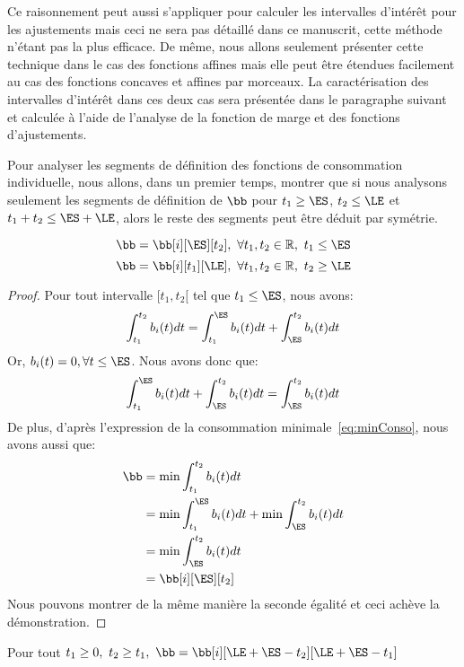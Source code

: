 Ce raisonnement peut aussi s'appliquer pour calculer les intervalles
d'intérêt pour les ajustements mais ceci ne sera pas détaillé dans ce
manuscrit, cette méthode n'étant pas la plus efficace. De même, nous
allons seulement présenter cette technique dans le cas des fonctions
affines mais elle peut être étendues facilement au cas des fonctions
concaves et affines par morceaux. La caractérisation des intervalles
d'intérêt dans ces deux cas sera présentée dans le paragraphe suivant
et calculée à l'aide de l'analyse de la fonction de marge et des
fonctions d'ajustements. 

Pour analyser les segments de définition des fonctions de consommation
individuelle, nous allons, dans un premier temps, montrer que si nous
analysons seulement les segments de définition de $\bb$ pour $t_1 \ge
\ES$, $t_2 \le \LE$ et $t_1+t_2 \le \ES + \LE$, alors le reste des
segments peut être déduit par symétrie.

\begin{lemma}
  \label{lem:sym1}
  \[\bb=\bb[i][\ES][t_2], \ \forall t_1,t_2 \in \mathbb{R},\ t_1 \le \ES\]
  \[\bb=\bb[i][t_1][\LE], \ \forall t_1,t_2 \in \mathbb{R},\ t_2 \ge
    \LE\]
\end{lemma}

\begin{proof}
  Pour tout intervalle $[t_1,t_2[$ tel que $t_1 \le \ES$, nous avons:
  \[ \int_{t_1}^{t_2} b_i(t)dt = \int_{t_1}^{\ES} b_i(t)dt+\int_{\ES}^{t_2} b_i(t)dt\]
  Or, $b_i(t)=0, \forall t \le \ES$. Nous avons donc que:
  \[\int_{t_1}^{\ES} b_i(t)dt+\int_{\ES}^{t_2} b_i(t)dt=
    \int_{\ES}^{t_2} b_i(t)dt\]
  De plus, d'après l'expression de la consommation
  minimale~\eqref{eq:minConso}, nous avons aussi que:
  \begin{align*}
    \bb &= \min \int_{t_1}^{t_2} b_i(t)dt \\
        &=\min \int_{t_1}^{\ES} b_i(t)dt+ \min \int_{\ES}^{t_2} b_i(t)dt\\
        &= \min \int_{\ES}^{t_2} b_i(t)dt\\
        & = \bb[i][\ES][t_2]
  \end{align*}
  Nous pouvons montrer de la même manière la seconde égalité et ceci
  achève la démonstration.
\end{proof}


\begin{lemma}
  \label{lem:sym2}
  Pour tout $t_1 \ge 0,\ t_2 \ge t_1,\ \bb= \bb[i][\LE+\ES-t_2][\LE +
  \ES -t_1]$ 
\end{lemma}

